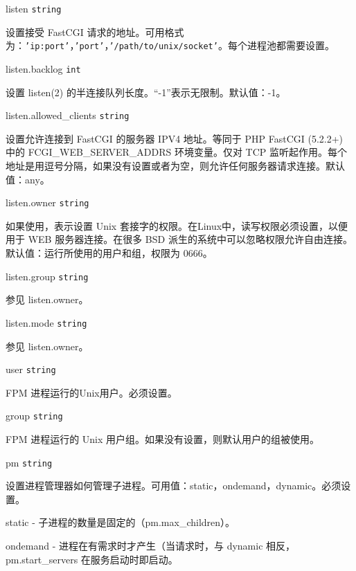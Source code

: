 \begin{compactitem}
\item listen \texttt{string}

设置接受 FastCGI 请求的地址。可用格式为：\texttt{'ip:port'}，\texttt{'port'}，\texttt{'/path/to/unix/socket'}。每个进程池都需要设置。

\item listen.backlog \texttt{int}

设置 listen(2) 的半连接队列长度。“-1”表示无限制。默认值：-1。

\item listen.allowed\_clients \texttt{string}

设置允许连接到 FastCGI 的服务器 IPV4 地址。等同于 PHP FastCGI (5.2.2+) 中的 FCGI\_WEB\_SERVER\_ADDRS 环境变量。仅对 TCP 监听起作用。每个地址是用逗号分隔，如果没有设置或者为空，则允许任何服务器请求连接。默认值：any。

\item listen.owner \texttt{string}

如果使用，表示设置 Unix 套接字的权限。在Linux中，读写权限必须设置，以便用于 WEB 服务器连接。在很多 BSD 派生的系统中可以忽略权限允许自由连接。默认值：运行所使用的用户和组，权限为 0666。

\item listen.group \texttt{string}

参见 listen.owner。

\item listen.mode \texttt{string}

参见 listen.owner。

\item user \texttt{string}

FPM 进程运行的Unix用户。必须设置。

\item group \texttt{string}

FPM 进程运行的 Unix 用户组。如果没有设置，则默认用户的组被使用。

\item pm \texttt{string}

设置进程管理器如何管理子进程。可用值：static，ondemand，dynamic。必须设置。

\begin{compactenum}
\item static - 子进程的数量是固定的（pm.max\_children）。

\item ondemand - 进程在有需求时才产生（当请求时，与 dynamic 相反，pm.start\_servers 在服务启动时即启动。


\end{compactenum}
\end{compactitem}
